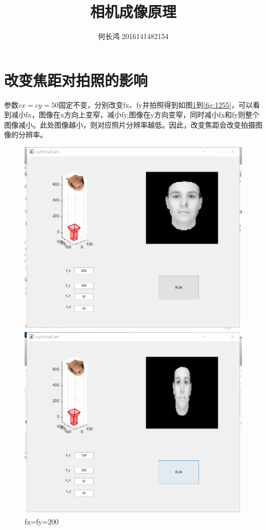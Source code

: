 \documentclass{xcumcmart}
\title{相机成像原理}
\author{何长鸿 2016141482154}
\begin{document}
\renewcommand\arraystretch{2}
\maketitle

\section{改变焦距对拍照的影响}
\par 参数$cx=cy=50$固定不变，分别改变fx、fy并拍照得到如图\ref{fig:2255}到\ref{fig:1255}，可以看到减小fx，图像在x方向上变窄，减小fy,图像在y方向变窄，同时减小fx和fy则整个图像减小。此处图像越小，则对应照片分辨率越低。因此，改变焦距会改变拍摄图像的分辨率。
\begin{figure}[htbp]
\centering
\begin{minipage}[htbp]{0.48\linewidth}
    \centering
	\includegraphics[width=1\textwidth]{fig/2255.png}
	\caption{fx=fy=200\label{fig:2255}}
\end{minipage}
\hfill
\begin{minipage}[htbp]{0.48\linewidth}
    \centering
	\includegraphics[width=1\textwidth]{fig/1255.png}

\end{minipage}
\end{figure}
\end{document}
